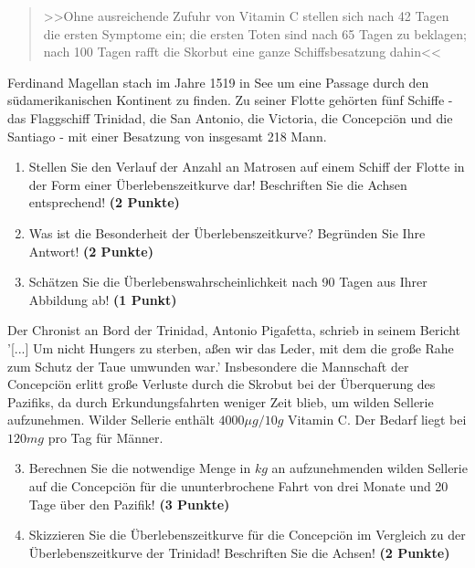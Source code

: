 \documentclass[a4paper, 9pt]{scrartcl}\usepackage[]{graphicx}\usepackage[]{xcolor}
\begin{document}
\begin{quote}
  >>Ohne ausreichende Zufuhr von Vitamin C stellen sich nach 42 Tagen die ersten Symptome ein; die ersten Toten sind nach 65 Tagen zu beklagen; nach 100 Tagen rafft die Skorbut eine ganze Schiffsbesatzung dahin<<
\end{quote}

Ferdinand Magellan stach im Jahre 1519 in See um eine Passage durch den südamerikanischen Kontinent zu finden. Zu seiner Flotte gehörten fünf Schiffe - das Flaggschiff Trinidad, die San Antonio, die Victoria, die Concepciön und die Santiago - mit einer Besatzung von insgesamt 218 Mann. 

\begin{enumerate}
\item Stellen Sie den Verlauf der Anzahl an Matrosen auf einem Schiff der Flotte in der Form einer Überlebenszeitkurve dar! Beschriften Sie die Achsen entsprechend! \textbf{(2 Punkte)} 
\item Was ist die Besonderheit der Überlebenszeitkurve? Begründen Sie Ihre Antwort! \textbf{(2 Punkte)} 
\item Schätzen Sie die Überlebenswahrscheinlichkeit nach 90 Tagen aus Ihrer Abbildung ab! \textbf{(1 Punkt)} 
\end{enumerate}

Der Chronist an Bord der Trinidad, Antonio Pigafetta, schrieb in seinem Bericht '[...] Um nicht Hungers zu sterben, aßen wir das Leder, mit dem die große Rahe zum Schutz der Taue umwunden war.' Insbesondere die Mannschaft der Concepciön erlitt große Verluste durch die Skrobut bei der Überquerung des Pazifiks, da durch Erkundungsfahrten weniger Zeit blieb, um wilden Sellerie aufzunehmen. Wilder Sellerie enthält $4000\mu g/10g$ Vitamin C. Der Bedarf liegt bei $120mg$ pro Tag für Männer.

\begin{enumerate}
  \setcounter{enumi}{2}
\item Berechnen Sie die notwendige Menge in $kg$ an aufzunehmenden wilden Sellerie auf die Concepciön für die ununterbrochene Fahrt von drei Monate und 20 Tage über den Pazifik! \textbf{(3 Punkte)}
\item Skizzieren Sie die Überlebenszeitkurve für die Concepciön im Vergleich zu der Überlebenszeitkurve der Trinidad! Beschriften Sie die Achsen! \textbf{(2 Punkte)}
\end{enumerate}

 
\clearpage
\end{document}
